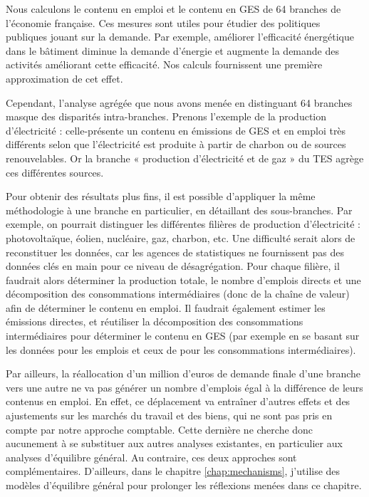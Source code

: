 Nous calculons le contenu en emploi et le contenu en GES de 64 branches de l’économie française. 
Ces mesures sont utiles pour étudier des politiques publiques jouant sur la demande. 
Par exemple, améliorer l’efficacité énergétique dans le bâtiment diminue la demande d’énergie et augmente la demande des activités améliorant cette efficacité. Nos calculs fournissent une première approximation de cet effet.

Cependant, l’analyse agrégée que nous avons menée en distinguant 64 branches masque des disparités intra-branches. Prenons l’exemple de la production d’électricité : celle-présente un contenu en émissions de GES et en emploi très différents selon que l’électricité est produite à partir de charbon ou de sources renouvelables. 
Or la branche « production d’électricité et de gaz » du TES agrège ces différentes sources.

Pour obtenir des résultats plus fins, il est possible d’appliquer la même méthodologie à une branche en particulier, en détaillant des sous-branches. 
Par exemple, on pourrait distinguer les différentes filières de production d’électricité : photovoltaïque, éolien, nucléaire, gaz, charbon, etc. 
Une difficulté serait alors de reconstituer les données, car les agences de statistiques ne fournissent pas des données clés en main pour ce niveau de désagrégation. 
Pour chaque filière, il faudrait alors déterminer la production totale, le nombre d’emplois directs et une décomposition des consommations intermédiaires (donc de la chaîne de valeur) afin de déterminer le contenu en emploi. 
Il faudrait également estimer les émissions directes, et réutiliser la décomposition des consommations intermédiaires pour déterminer le contenu en GES (par exemple en se basant sur les données \citet{InNumeri2016} pour les emplois et ceux de \citet{Lehr2008} pour les consommations intermédiaires).

Par ailleurs, la réallocation d’un million d’euros de demande finale d’une branche vers une autre ne va pas générer un nombre d’emplois égal à la différence de leurs contenus en emploi. 
En effet, ce déplacement va entraîner d’autres effets et des ajustements sur les marchés du travail et des biens, qui ne sont pas pris en compte par notre approche comptable. 
Cette dernière ne cherche donc aucunement à se substituer aux autres analyses existantes, en particulier aux analyses d’équilibre général. Au contraire, ces deux approches sont complémentaires. D'ailleurs, dans le chapitre \ref{chap:mechanisms}, j'utilise des modèles d'équilibre général pour prolonger les réflexions menées dans ce chapitre.

